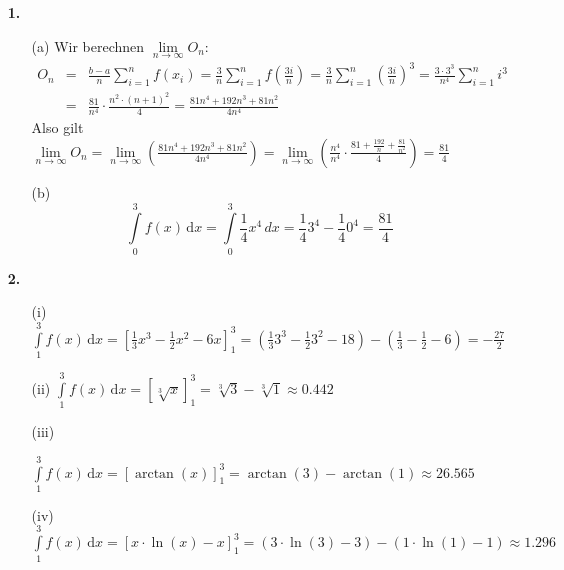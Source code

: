 \documentclass[a4paper,11pt]{scrartcl}
\author{\authorinfo}
\title{\titleinfo}
\date{\today}
\newcommand{\dx}[0]{\, \mathrm{d}x}
\begin{document}
\maketitle
\begin{enumerate}
    \item[\textbf{1.}]
        \begin{enumerate}
            \item[(a)]
                Wir berechnen $\lim\limits_{n \to \infty} O_n$:
                \begin{eqnarray}
                O_n &=& \frac{b-a}{n}\sum_{i=1}^n f(x_i)=\frac{3}{n}\sum_{i=1}^n f\left(\frac{3i}{n}\right)=\frac{3}{n}\sum_{i=1}^n\left(\frac{3i}{n}\right)^3=\frac{3 \cdot 3^3}{n^4}\sum_{i=1}^n i^3 \\ \nonumber
                &=& \frac{81}{n^4} \cdot \frac{n^2\cdot\left(n+1\right)^2}{4}=\frac{81n^4+192n^3+81n^2}{4n^4}
                \end{eqnarray}
                Also gilt $\lim\limits_{n\to \infty} O_n = \lim \limits_{n\to\infty}\left(\frac{81n^4+192n^3+81n^2}{4n^4}\right)= \lim \limits_{n\to\infty}\left(\frac{n^4}{n^4}\cdot\frac{81+\frac{192}{n}+\frac{81}{n^2}}{4}\right)=\frac{81}{4}$
            \item[(b)]
                    \[\int\limits_0^3 f(x) \dx = \int\limits_0^3\frac{1}{4}x^4 \, dx = \frac{1}{4}3^4 - \frac{1}{4}0^4= \frac{81}{4}\]
        \end{enumerate}
    \item[\textbf{2.}]
        \begin{enumerate}
            \item[(i)]
                $\int\limits_1^3 f(x) \dx = [\frac{1}{3}x^3 - \frac{1}{2}x^2 - 6x]_1^3= \left( \frac{1}{3}3^3 - \frac{1}{2}3^2 - 18 \right)- \left( \frac{1}{3} - \frac{1}{2} - 6\right) = - \frac{27}{2}$

            \item[(ii)]
                $\int\limits_1^3 f(x) \dx = [\sqrt[3]{x}]_1^3 = \sqrt[3]{3}-\sqrt[3]{1} \approx 0.442$

            \item[(iii)]
                
                $\int\limits_1^3 f(x) \dx =[\arctan(x)]_1^3=\arctan(3) - \arctan(1) \approx 26.565$
            \item[(iv)]
                $\int\limits_1^3 f(x) \dx = [x \cdot \ln(x) - x]_1^3 = \left( 3 \cdot \ln (3) -3 \right)-\left(1 \cdot \ln (1) - 1 \right) \approx 1.296$
              

\end{enumerate}
\end{enumerate}
\end{document}
